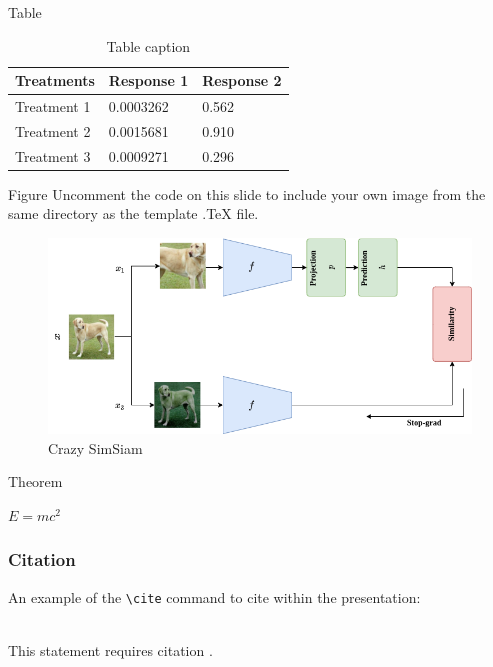 \documentclass[aspectratio=169,xcolor=dvipsnames]{beamer}
\begin{document}
\begin{frame}{Table}
    \begin{table}
        \begin{tabular}{l l l}
            \toprule
            \textbf{Treatments} & \textbf{Response 1} & \textbf{Response 2} \\
            \midrule
            Treatment 1         & 0.0003262           & 0.562               \\
            Treatment 2         & 0.0015681           & 0.910               \\
            Treatment 3         & 0.0009271           & 0.296               \\
            \bottomrule
        \end{tabular}
        \caption{Table caption}
    \end{table}
\end{frame}



\begin{frame}{Figure}
    Uncomment the code on this slide to include your own image from the same directory as the template .TeX file.
\begin{figure}
    \centering
    \includegraphics[scale=0.4]{figures/simsiam.png}
    \caption{Crazy SimSiam}
    \label{fig:my_label}
\end{figure}
\end{frame}



\begin{frame}{Theorem}
    \begin{theorem}
        $E = mc^2$
    \end{theorem}
\end{frame}


\begin{frame}[fragile] %
    \frametitle{Citation}
    An example of the \verb|\cite| command to cite within the presentation:\\~

    This statement requires citation \cite{p1}.
\end{frame}



\end{document}
